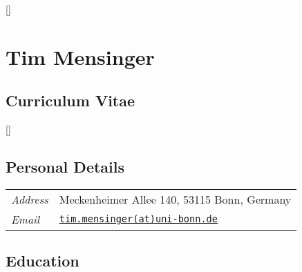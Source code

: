 \documentclass{article}
\begin{document}
\thispagestyle{empty}
\renewcommand\labelitemi{\tiny$\bullet$}

\titlespacing*{\section}{0pt}{0pt}{0pt}
\titlespacing*{\subsection}{0pt}{0pt}{0pt}

\titleformat{\section}{\normalfont\Large\bfseries}{\thesection}{1em}{}[{\titlerule[0.8pt]}]


\section*{\hfill \LARGE Tim Mensinger}\vspace*{3pt}
\subsection*{\hfill Curriculum Vitae}

\titleformat{\subsection}{\normalfont\bfseries}{\thesection}{1em}{}[{\titlerule[0.4pt]}]

\vspace{15pt}
\subsection*{Personal Details}

\begin{table}[h!]
    \renewcommand{\arraystretch}{1.25}
    \begin{tabular}{p{125pt} p{350pt}}
         \textit{Address} &  Meckenheimer Allee 140, 53115 Bonn, Germany\\
         \textit{Email} & \href{mailto:tim.mensinger@uni-bonn.de}{\texttt{tim.mensinger(at)uni-bonn.de}}
    \end{tabular}
\end{table}

\subsection*{Education}
\end{document}
